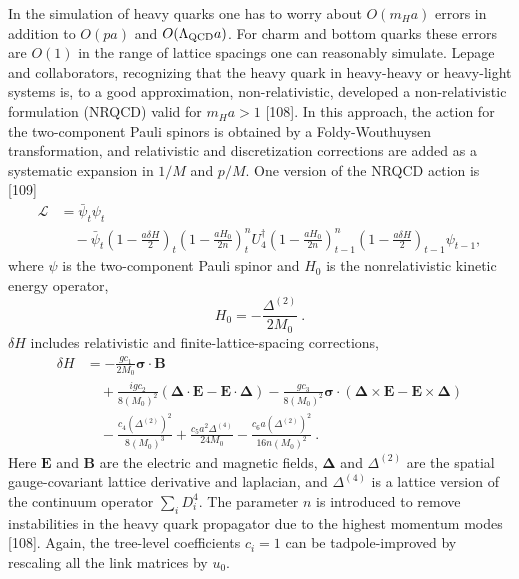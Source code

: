 In the simulation of heavy quarks one has to worry about $O(m_H a)$
errors in addition to $O(pa)$ and $O(\Lambda_{\rm QCD} a)$.  For charm and
bottom quarks these errors are $O(1)$ in the range of lattice spacings
one can reasonably simulate.  Lepage and collaborators, recognizing
that the heavy quark in heavy-heavy or heavy-light systems is, to a
good approximation, non-relativistic, developed a non-relativistic
formulation (NRQCD) valid for $m_H a > 1$ [108].
In this approach, the action for the two-component Pauli spinors
is obtained by a Foldy-Wouthuysen transformation, and relativistic and
discretization corrections are added as a systematic expansion in $1/M$
and $p/M$.
One version of the NRQCD action is [109]
\begin{align}
\mathcal{L}
&= \bar{\psi}_t \psi_t \nonumber\\
&\quad - \bar{\psi}_t
   \left( 1 - \frac{a \delta H}{2} \right)_t
   \left( 1 - \frac{a H_0}{2n} \right)^n_t
   U_4^\dagger
   \left( 1 - \frac{a H_0}{2n} \right)^n_{t-1}
   \left( 1 - \frac{a \delta H}{2} \right)_{t-1} \psi_{t-1},
\label{eq:nrqcdact}
\end{align}
where $\psi$ is the two-component Pauli spinor and
$H_0$ is the nonrelativistic kinetic energy operator,
\begin{equation}
H_0 = - \frac{\Delta^{(2)}}{2 M_0} \ .
\label{eq:nrqcdH0}
\end{equation}
$\delta H$ includes relativistic and finite-lattice-spacing
corrections,
\begin{align}
\delta H
&= - \frac{g c_1}{2 M_0} \boldsymbol{\sigma}\cdot\boldsymbol{B} \nonumber\\
&\quad + \frac{i g c_2}{8 (M_0)^2}
   \left( \boldsymbol{\Delta}\cdot\boldsymbol{E} - \boldsymbol{E}\cdot\boldsymbol{\Delta} \right)
   - \frac{g c_3}{8 (M_0)^2}
   \boldsymbol{\sigma}\cdot
   \left( \boldsymbol{\Delta}\times\boldsymbol{E} - \boldsymbol{E}\times\boldsymbol{\Delta} \right) \nonumber\\
&\quad - \frac{c_4 (\Delta^{(2)})^2}{8 (M_0)^3}
   + \frac{c_5 a^2 \Delta^{(4)}}{24 M_0}
   - \frac{c_6 a (\Delta^{(2)})^2}{16 n (M_0)^2} \ .
\label{eq:NRQCDdeltaH}
\end{align}
Here $\boldsymbol{E}$ and $\boldsymbol{B}$ are the electric and magnetic fields,
$\boldsymbol{\Delta}$ and $\Delta^{(2)}$ are the
spatial gauge-covariant lattice derivative and
laplacian, and $\Delta^{(4)}$ is a lattice version of the continuum
operator $\sum_i D_i^4$.  The parameter $n$ is introduced to remove
instabilities in the heavy quark propagator due to the highest
momentum modes [108].  Again, the tree-level
coefficients $c_i = 1$ can be tadpole-improved by rescaling all the
link matrices by $u_0$.

